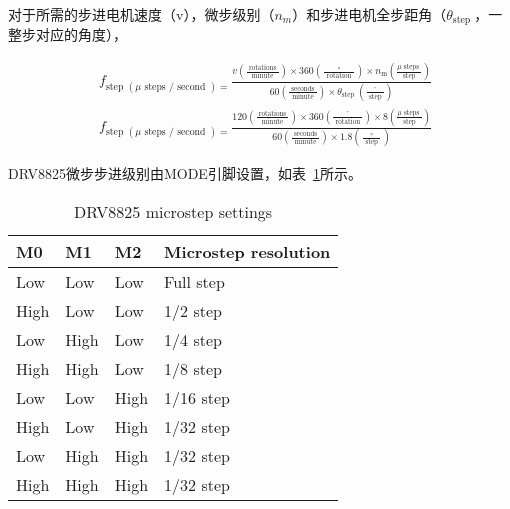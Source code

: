 对于所需的步进电机速度（v），微步级别（$n_m$）和步进电机全步距角（$\theta_{\text {step }}$，一整步对应的角度），

\begin{equation}
    \begin{aligned}
    &f_{\text {step }(\mu \text { steps } / \text { second })=} \frac{v\left(\frac{\text { rotations }}{\text { minute }}\right) \times 360\left(\frac{\circ}{\text { rotation }}\right) \times n_{\mathrm{m}}\left(\frac{\mu \text { steps }}{\text { step }}\right)}{60\left(\frac{\text { seconds }}{\text { minute }}\right) \times \theta_{\text {step }}\left(\frac{^{\circ}}{\text { step }}\right)}\\
    &f_{\text {step }(\mu \text { steps } / \text { second })=} \frac{120\left(\frac{\text { rotations }}{\text { minute }}\right) \times 360\left(\frac{^{\circ}}{\text { rotation }}\right) \times 8\left(\frac{\mu \text { steps }}{\text { step }}\right)}{60\left(\frac{\text { seconds }}{\text { minute }}\right) \times 1.8\left(\frac{\circ}{\text { step }}\right)}
    \end{aligned}
\end{equation}

DRV8825微步步进级别由MODE引脚设置，如表~\ref{tab:DRV8825-microstep-settings}所示。

\begin{table}[htbp]
    \centering
    \begin{tabular}{llll}
    \hline
    M0   & M1   & M2   & Microstep resolution \\ \hline
    Low  & Low  & Low  & Full step            \\ \hline
    High & Low  & Low  & 1/2 step             \\ \hline
    Low  & High & Low  & 1/4 step             \\ \hline
    High & High & Low  & 1/8 step             \\ \hline
    Low  & Low  & High & 1/16 step            \\ \hline
    High & Low  & High & 1/32 step            \\ \hline
    Low  & High & High & 1/32 step            \\ \hline
    High & High & High & 1/32 step            \\ \hline
    \end{tabular}
    \caption{DRV8825 microstep settings}
    \label{tab:DRV8825-microstep-settings}
\end{table}

